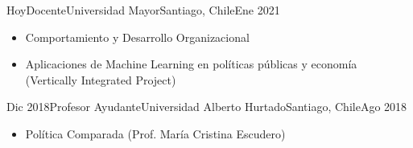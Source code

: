 





\begin{experiences}
  \experience
    {Hoy}{Docente}{Universidad Mayor}{Santiago, Chile}{Ene 2021}
    {\begin{itemize}
    \item Comportamiento y Desarrollo Organizacional
    \item Aplicaciones de Machine Learning en políticas públicas y economía (Vertically Integrated Project)
    \end{itemize}}
    {}
\end{experiences}
\vspace{-2mm}

\begin{experiences}
  \experience
    {Dic 2018}{Profesor Ayudante}{Universidad Alberto Hurtado}{Santiago, Chile}{Ago 2018}
    {\begin{itemize}
    \item Política Comparada {\small (Prof. María Cristina Escudero)}
    \end{itemize}}
    {}
\end{experiences}
\vspace{-2mm}

